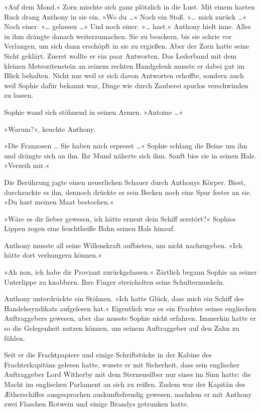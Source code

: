 »Auf dem Mond.« Zorn mischte sich ganz plötzlich in die Lust. Mit
einem harten Ruck drang Anthony in sie ein. »Wo du …« Noch ein
Stoß. »… mich zurück …« Noch einer. »… gelassen …« Und noch einer.
»… hast.« Anthony hielt inne. Alles in ihm drängte danach
weiterzumachen. Sie zu beackern, bis sie schrie vor Verlangen, um
sich dann erschöpft in sie zu ergießen. Aber der Zorn hatte seine
Sicht geklärt. Zuerst wollte er ein paar Antworten. Das Lederband
mit dem kleinen Meteoritenstein an seinem rechten Handgelenk musste
er dabei gut im Blick behalten. Nicht nur weil er sich davon
Antworten erhoffte, sondern auch weil Sophie dafür bekannt war,
Dinge wie durch Zauberei spurlos verschwinden zu lassen.

Sophie wand sich stöhnend in seinen Armen. »Antoine …«

»Warum?«, keuchte Anthony.

»Die Franzosen … Sie haben mich erpresst …« Sophie schlang die
Beine um ihn und drängte sich an ihn. Ihr Mund näherte sich ihm.
Sanft biss sie in seinen Hals. »Verzeih mir.«

Die Berührung jagte einen neuerlichen Schauer durch Anthonys
Körper. Biest, durchzuckte es ihn, dennoch drückte er sein Becken
noch eine Spur fester an sie. »Du hast meinen Maat bestochen.«

»Wäre es dir lieber gewesen, ich hätte erneut dein Schiff
zerstört?« Sophies Lippen zogen eine feuchtheiße Bahn seinen Hals
hinauf.

Anthony musste all seine Willenskraft aufbieten, um nicht
nachzugeben. »Ich hätte dort verhungern können.«

»Ah non, ich habe dir Proviant zurückgelassen.« Zärtlich begann
Sophie an seiner Unterlippe zu knabbern. Ihre Finger streichelten
seine Schultermuskeln.

Anthony unterdrückte ein Stöhnen. »Ich hatte Glück, dass mich ein
Schiff des Handelssyndikats aufgelesen hat.« Eigentlich war es ein
Frachter seines englischen Auftraggebers gewesen, aber das musste
Sophie nicht erfahren. Immerhin hatte er so die Gelegenheit nutzen
können, um seinem Auftraggeber auf den Zahn zu fühlen.

Seit er die Frachtpapiere und einige Schriftstücke in der Kabine
des Frachterkapitäns gelesen hatte, wusste er mit Sicherheit, dass
sein englischer Auftraggeber Lord Witherby mit dem Sternensilber
nur eines im Sinn hatte: die Macht im englischen Parlament an sich
zu reißen. Zudem war der Kapitän des Ætherschiffes ausgesprochen
auskunftsfreudig gewesen, nachdem er mit Anthony zwei Flaschen
Rotwein und einige Brandys getrunken hatte.

